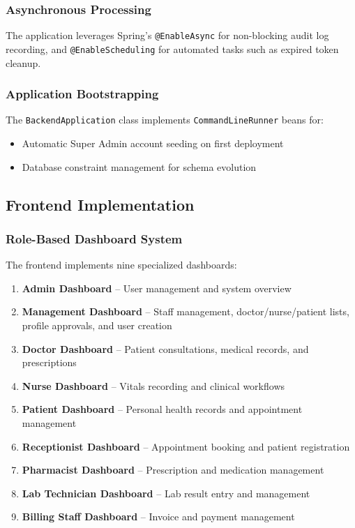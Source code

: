 \documentclass[conference]{IEEEtran}
\begin{document}
\subsubsection{Asynchronous Processing}
The application leverages Spring's \texttt{@EnableAsync} for non-blocking audit log recording, and \texttt{@EnableScheduling} for automated tasks such as expired token cleanup.

\subsubsection{Application Bootstrapping}
The \texttt{BackendApplication} class implements \texttt{CommandLineRunner} beans for:
\begin{itemize}[leftmargin=*]
  \item Automatic Super Admin account seeding on first deployment
  \item Database constraint management for schema evolution
\end{itemize}

\subsection{Frontend Implementation}

\subsubsection{Role-Based Dashboard System}
The frontend implements nine specialized dashboards:
\begin{enumerate}[leftmargin=*]
  \item \textbf{Admin Dashboard} -- User management and system overview
  \item \textbf{Management Dashboard} -- Staff management, doctor/nurse/patient lists, profile approvals, and user creation
  \item \textbf{Doctor Dashboard} -- Patient consultations, medical records, and prescriptions
  \item \textbf{Nurse Dashboard} -- Vitals recording and clinical workflows
  \item \textbf{Patient Dashboard} -- Personal health records and appointment management
  \item \textbf{Receptionist Dashboard} -- Appointment booking and patient registration
  \item \textbf{Pharmacist Dashboard} -- Prescription and medication management
  \item \textbf{Lab Technician Dashboard} -- Lab result entry and management
  \item \textbf{Billing Staff Dashboard} -- Invoice and payment management
\end{enumerate}
\end{document}
